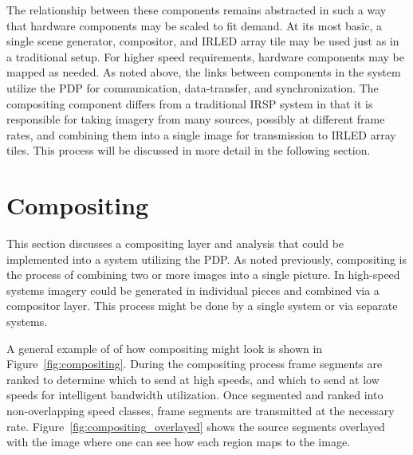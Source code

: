     The relationship between these components remains abstracted in such a way that hardware components may be scaled to fit demand. At its most basic, a single scene generator, compositor, and IRLED array tile may be used just as in a traditional setup. For higher speed requirements, hardware components may be mapped as needed. As noted above, the links between components in the system utilize the PDP for communication, data-transfer, and synchronization. The compositing component differs from a traditional IRSP system in that it is responsible for taking imagery from many sources, possibly at different frame rates, and combining them into a single image for transmission to IRLED array tiles. This process will be discussed in more detail in the following section.

\section{Compositing}
    \label{sec:compositing}
    This section discusses a compositing layer and analysis that could be implemented into a system utilizing the PDP. As noted previously, compositing is the process of combining two or more images into a single picture. In high-speed systems imagery could be generated in individual pieces and combined via a compositor layer. This process might be done by a single system or via separate systems.

    A general example of of how compositing might look is shown in Figure~\ref{fig:compositing}. During the compositing process frame segments are ranked to determine which to send at high speeds, and which to send at low speeds for intelligent bandwidth utilization. Once segmented and ranked into non-overlapping speed classes, frame segments are transmitted at the necessary rate. Figure~\ref{fig:compositing_overlayed} shows the source segments overlayed with the image where one can see how each region maps to the image.

